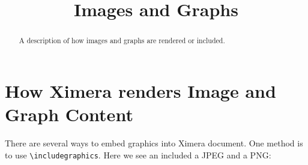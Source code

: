 \documentclass{ximera}
\title{Images and Graphs}
\begin{document}
\begin{abstract}
    A description of how images and graphs are rendered or included.
\end{abstract}
\maketitle




\section*{How Ximera renders Image and Graph Content}

There are several ways to embed graphics into Ximera document. One method is to use \verb|\includegraphics|. Here we see an included a JPEG and a PNG:
\end{document}
